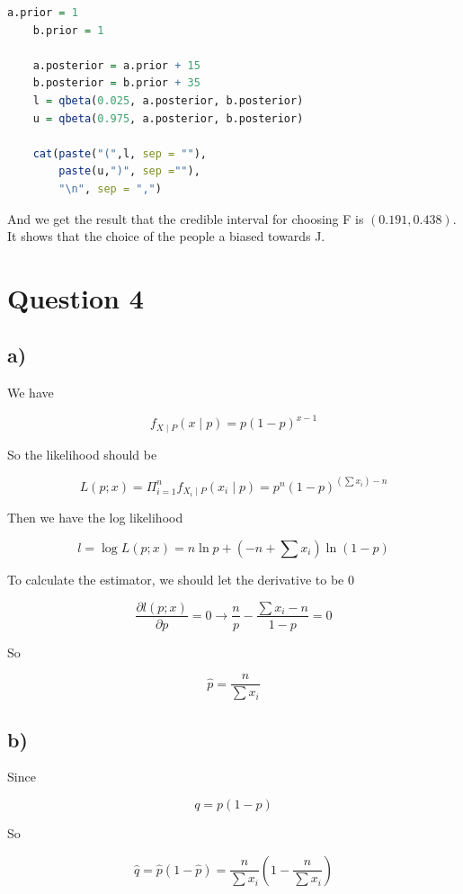 \documentclass[12pt]{article}
\begin{document}
\begin{flushleft}
\begin{lstlisting}[language=R]
    a.prior = 1
    b.prior = 1

    a.posterior = a.prior + 15
    b.posterior = b.prior + 35
    l = qbeta(0.025, a.posterior, b.posterior) 
    u = qbeta(0.975, a.posterior, b.posterior)

    cat(paste("(",l, sep = ""), 
        paste(u,")", sep =""), 
        "\n", sep = ",")

\end{lstlisting} 

\qquad And we get the result that the credible interval for choosing F is $(0.191, 0.438)$. It shows that the choice of the people a biased towards J.


\section{Question 4}

\subsection*{a)}

\qquad We have 

$$
f_{X\mid P}(x\mid p) = p(1-p)^{x-1}
$$

\qquad So the likelihood should be 

$$
L(p; x) = \Pi_{i=1}^n f_{X_i \mid P}(x_i \mid p) = p^n(1-p)^{(\sum x_i) - n}
$$

\qquad Then we have the log likelihood

$$
l = \log L(p;x) = n\ln p + (-n +\sum x_i) \ln (1-p)
$$

\qquad To calculate the estimator, we should let the derivative to be 0

$$
\frac{\partial l(p;x)}{\partial p} = 0 \longrightarrow \frac{n}{p} - \frac{\sum x_i - n}{1-p} = 0
$$

\qquad So

$$
\hat{p} =\frac{n}{\sum x_i}
$$

\subsection*{b)}

\qquad Since

$$
q = p(1-p)
$$

\qquad So

$$
\hat{q} = \hat{p}(1-\hat{p}) = \frac{n}{\sum x_i}(1- \frac{n}{\sum x_i})
$$


\end{flushleft}
\end{document}
